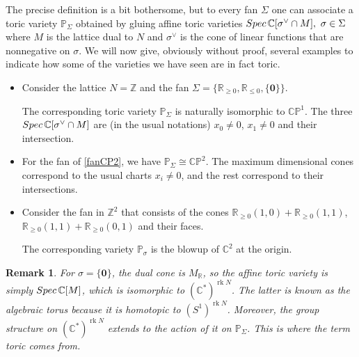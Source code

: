 \documentclass[11pt]{article}
\numberwithin{equation}{section}
\numberwithin{footnote}{section}
\newtheorem{rem}[thm]{Remark}
\newcommand{\blue}{\color{blue}}
\renewcommand{\P}{{\mathbb P}}
\newcommand{\R}{{\mathbb R}}
\newcommand{\Z}{{\mathbb Z}}
\newcommand{\C}{{\mathbb C}}
\DeclareMathOperator{\rk}{rk}
\begin{document}
The precise definition is a bit bothersome, but to every fan $\Sigma$ one can associate a toric variety $\P_\Sigma$ obtained by gluing affine toric varieties ${\rm Spec}\,\C[\sigma^\vee \cap M],~\sigma\in\Sigma$  where $M$ is the lattice dual to $N$ and $\sigma^\vee$ is the cone of linear functions that are nonnegative on $\sigma$. We will now give, obviously without proof, several examples to indicate how some of the varieties we have seen are in fact toric.
\begin{itemize}
\item Consider the lattice $N=\Z$ and the fan $\Sigma =\{\R_{\geq 0},\R_{\leq 0}, \{{\mathbf 0}\}\}$. 




The corresponding toric variety $\P_\Sigma$ is naturally isomorphic to $\C\P^1$. The three ${\rm Spec}\,\C[\sigma^\vee \cap M]$ are (in the usual notations) $x_0\neq 0$, $x_1\neq 0$ and their intersection.

\item For the fan of \eqref{fanCP2}, we have $\P_\Sigma\cong \C\P^2$. The maximum dimensional cones correspond to the usual charts $x_i\neq 0$, and the rest correspond to their intersections.

\item Consider the fan in $\Z^2$ that consists of the cones $\R_{\geq 0} (1,0)+\R_{\geq 0} (1,1)$, $\R_{\geq 0} (1,1)+\R_{\geq 0} (0,1)$ and their faces. 


\noindent
The corresponding variety $\P_\sigma$ is the blowup of $\C^2$ at the origin.
\end{itemize}

\smallskip
\begin{rem}
For $\sigma=\{{\mathbf 0}\}$, the dual cone is $M_\R$, so the affine toric variety is simply ${\rm Spec}\,\C[M]$, which is isomorphic to
$(\C^*)^{\rk N}$. The latter is known as the {\blue algebraic torus} because it is homotopic to $(S^1)^{\rk N}$. 
Moreover, the group structure on $(\C^*)^{\rk N}$ extends to the action of it on $\P_\Sigma$. This is where the term {\blue toric} comes from.
\end{rem}
\end{document}
